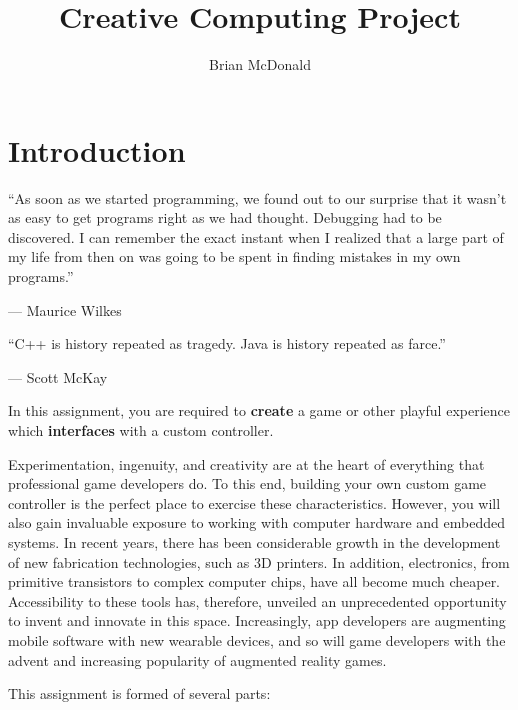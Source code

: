 \documentclass{../../fal_assignment}
\title{Creative Computing Project}
\author{Brian McDonald}
\begin{document}
	
	\maketitle
	
	\section*{Introduction}
	
	\begin{marginquote}
		``As soon as we started programming, we found out to our surprise that it 
		wasn't as easy to get programs right as we had thought. 
		Debugging had to be discovered. I can remember the exact instant when 
		I realized that a large part of my life from then on was going to be spent 
		in finding mistakes in my own programs.''
		\par --- Maurice Wilkes
		\marginquoterule
		\par ``C++ is history repeated as tragedy. Java is history repeated as farce.''
		\par --- Scott McKay
	\end{marginquote}
	
	In this assignment, you are required to \textbf{create} a game or other playful experience 
	which \textbf{interfaces} with a custom controller.
	
	Experimentation, ingenuity, and creativity are at the heart of everything that professional 
	game developers do. To this end, building your own custom game controller is the perfect 
	place to exercise these characteristics. However, you will also gain invaluable exposure to 
	working with computer hardware and embedded systems. In recent years, there has been considerable growth in the 
	development of new fabrication technologies, such as 3D printers. In addition, electronics, 
	from primitive transistors to complex computer chips, have all become much cheaper. Accessibility 
	to these tools has, therefore, unveiled an unprecedented opportunity to invent and innovate 
	in this space. Increasingly, app developers are augmenting mobile software with new wearable 
	devices, and so will game developers with the advent and increasing popularity of augmented 
	reality games.
	
	This assignment is formed of several parts:
\end{document}
